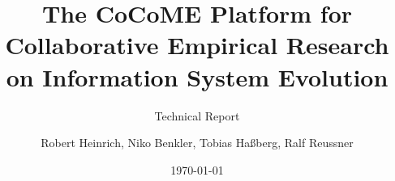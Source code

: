 \documentclass[12pt,headsepline,twoside,final]{scrreprt}
\begin{document}
	\setpdf
	
	\setcounter{secnumdepth}{3}
	
	\title{The CoCoME Platform for \linebreak Collaborative Empirical Research on Information System Evolution} 
	\subtitle{Technical Report}
	
	\author{Robert Heinrich, Niko Benkler, Tobias Ha{\ss}berg, Ralf Reussner}
	
	\date{\today}
	
	
	
	\maketitle
	\clearpage
	
	\tableofcontents
	\clearpage
	
	\listoffigures
	\clearpage
	
	
	
	
	
	
	
	
	
	
	
	
	
	
	
	
	
	\sloppy
\end{document}
